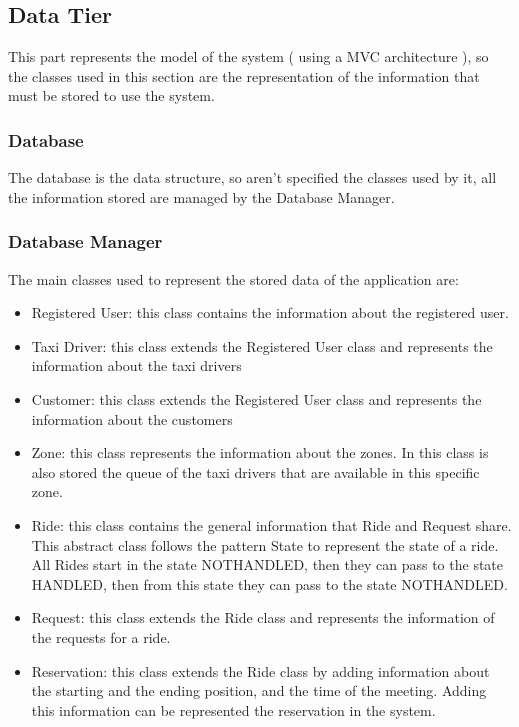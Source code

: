 \documentclass[../../../../../../dd.tex]{subfiles}
\begin{document}
	\subsection{Data Tier}
	This part represents the model of the system ( using a MVC architecture ), so the classes used in this section are the representation of the information that must be stored to use the system.
	\subsubsection{Database} The database is the data structure, so aren't specified the classes used by it, all the information stored are managed by the Database Manager.
	\subsubsection{Database Manager}
	The main classes used to represent the stored data of the application are:
	\begin{itemize}
	\item{Registered User}: this class contains the information about the registered user.
	\item{Taxi Driver}: this class extends the Registered User class and represents the information about the taxi drivers 
	\item{Customer}: this class extends the Registered User class and represents the information about the customers
	\item{Zone}: this class represents the information about the zones. In this class is also stored the queue of the taxi drivers that are available in this specific zone.
	\item{Ride}: this class contains the general information that Ride and Request share. This abstract class follows the pattern State to represent the state of a ride. All Rides start in the state NOT\textunderscore HANDLED, then they can pass to the  state HANDLED, then from this state they can pass to the state NOT\textunderscore HANDLED.
	\item{Request}: this class extends the Ride class and represents the information of the requests for a ride.
	\item{Reservation}: this class extends the Ride class by adding information about the starting and the ending position, and the time of the meeting. Adding this information can be represented the reservation in the system.
	
	\end{itemize}
	
\end{document}
